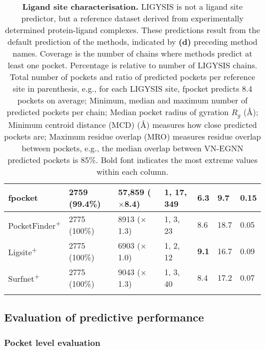 \begin{landscape}
\begin{longtable}[c]{|M{28mm}|M{29mm}|M{29mm}|M{41mm}|M{26mm}|M{26mm}|M{20mm}|}
fpocket       & 2759 (99.4\%) & \textbf{57,859 ($\times$8.4}) & 1, 17, \textbf{349}          & 6.3                              & 9.7                          & 0.15 \\ \hline
PocketFinder\textsuperscript{+} & 2775 (100\%)   & 8913 ($\times$1.3)  & 1, 3, 23            & 8.6                              & 18.7                         & 0.05 \\ \hline
Ligsite\textsuperscript{+}      & 2775 (100\%)   & 6903 ($\times$1.0)  & 1, 2, 12            & \textbf{9.1} & 16.7                         & 0.09 \\ \hline
Surfnet\textsuperscript{+}      & 2775 (100\%)   & 9043 ($\times$1.3)  & 1, 3, 40            & 8.4                              & 17.2                         & 0.07 \\ \hline
\caption[Ligand site characterisation]{\textbf{Ligand site characterisation.} LIGYSIS is not a ligand site predictor, but a reference dataset derived from experimentally determined protein-ligand complexes. These predictions result from the default prediction of the methods, indicated by \textbf{(d)} preceding method names. Coverage is the number of chains where methods predict at least one pocket. Percentage is relative to number of LIGYSIS chains. Total number of pockets and ratio of predicted pockets per reference site in parenthesis, e.g., for each LIGYSIS site, fpocket predicts 8.4 pockets on average; Minimum, median and maximum number of predicted pockets per chain; Median pocket radius of gyration $R_{g}$ (\AA{}); Minimum centroid distance (MCD) (\AA{}) measures how close predicted pockets are; Maximum residue overlap (MRO) measures residue overlap between pockets, e.g., the median overlap between VN-EGNN predicted pockets is 85\%. Bold font indicates the most extreme values within each column.}
\label{tab:pocket_features_stats}\\
\end{longtable}
\end{landscape}

\subsection{Evaluation of predictive performance}

\subsubsection{Pocket level evaluation}

